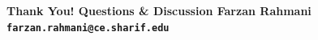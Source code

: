 \documentclass[11pt,aspectratio=169]{beamer}
\begin{document}
\begin{frame}[plain]
  \begin{center}
    \Huge\bfseries Thank You!
    \vskip 1cm
    \Large Questions \& Discussion
    \vskip 1.5cm
    \normalsize
    Farzan Rahmani \\
    \texttt{farzan.rahmani@ce.sharif.edu}
  \end{center}
\end{frame}
\end{document}
